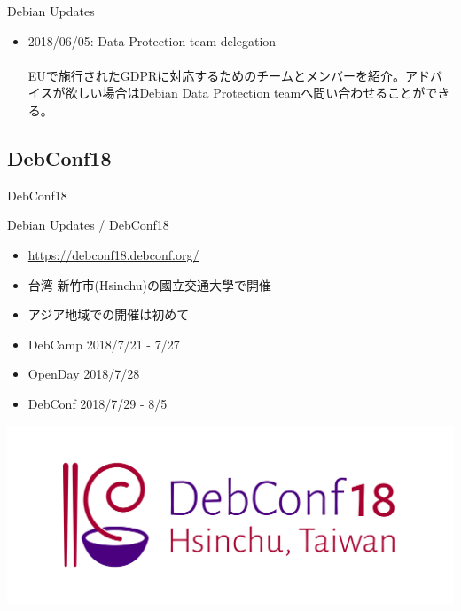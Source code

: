 \begin{frame}{Debian Updates}%

\begin{itemize}
\item 2018/06/05:  Data Protection team delegation\\
\ \\
\small{EUで施行されたGDPRに対応するためのチームとメンバーを紹介。アドバイスが欲しい場合はDebian Data Protection teamへ問い合わせることができる。}


\end{itemize}

\end{frame}


\subsection{DebConf18}

\begin{frame}
  \begin{center}\Huge{DebConf18}\end{center}
\end{frame}


\begin{frame}{Debian Updates / DebConf18}%

\begin{itemize}
    
\item \url{https://debconf18.debconf.org/}
\item 台湾 新竹市(Hsinchu)の國立交通大學で開催
\item アジア地域での開催は初めて
\item DebCamp 2018/7/21 - 7/27
\item OpenDay 2018/7/28
\item DebConf 2018/7/29 - 8/5

\end{itemize}

\includegraphics[scale=1.0]{image201810/DebConf18_Horizontal_Logo.png}

\end{frame}



